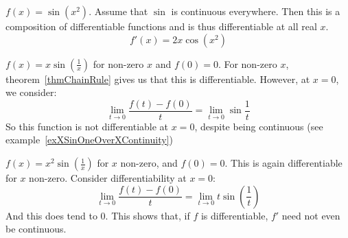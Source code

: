 \documentclass[../Main.tex]{subfiles}
\begin{document}
\begin{examples}{}
    \item $f(x) = \sin{(x^2)}$. Assume that $\sin$ is continuous everywhere. Then this is a composition of differentiable functions and is thus differentiable at all real $x$.
        \begin{equation*}
            f'(x) = 2x\cos{(x^2)}
        \end{equation*}
    \item $f(x) = x\sin{\left(\frac{1}{x}\right)}$ for non-zero $x$ and $f(0) = 0$. For non-zero $x$, theorem~\ref{thmChainRule} gives us that this is differentiable. However, at $x = 0$, we consider:
        \begin{equation*}
            \lim_{t \to 0} \frac{f(t) - f(0)}{t} = \lim_{t \to 0} \sin{\frac{1}{t}}
        \end{equation*}
        So this function is not differentiable at $x = 0$, despite being continuous (see example~\ref{exXSinOneOverXContinuity})
    \item $f(x) = x^2 \sin{\left(\frac{1}{x}\right)}$ for $x$ non-zero, and $f(0) = 0$. This is again differentiable for $x$ non-zero. Consider differentiability at $x = 0$:
        \begin{equation*}
            \lim_{t \to 0} \frac{f(t) - f(0)}{t} = \lim_{t \to 0}  t \sin{\left(\frac{1}{t}\right)}
        \end{equation*}
        And this does tend to 0. This shows that, if $f$ is differentiable, $f'$ need not even be continuous.
\end{examples}
\end{document}
